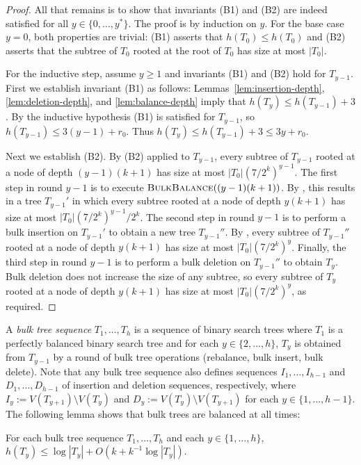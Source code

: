 \documentclass[kpfonts]{patmorin}
\let\le\leqslant
\let\ge\geqslant
\begin{document}
\begin{proof}
  All that remains is to show that invariants (B1) and (B2) are indeed satisfied for all $y\in\{0,\ldots,y^*\}$.  The proof is by induction on $y$.  For the base case $y=0$, both properties are trivial: (B1) asserts that $h(T_0)\le h(T_0)$ and (B2) asserts that the subtree of $T_0$ rooted at the root of $T_0$ has size at most $|T_0|$.

  For the inductive step, assume $y\ge 1$ and invariants (B1) and (B2) hold for $T_{y-1}$.  First we establish invariant (B1) as follows:
  Lemmas~\ref{lem:insertion-depth}, \ref{lem:deletion-depth}, and \ref{lem:balance-depth} imply that $h(T_y)\le h(T_{y-1})+3$.  
  By the inductive hypothesis (B1) is satisfied for $T_{y-1}$, so $h(T_{y-1})\le 3(y-1) + r_0$.  Thus $h(T_y)\le h(T_{y-1}) + 3 \le 3y+r_0$.
  
  Next we establish (B2).  By (B2) applied to $T_{y-1}$, every subtree of $T_{y-1}$ rooted at a node of depth $(y-1)(k+1)$ has size at most $|T_{0}|(7/2^k)^{y-1}$.  The first step in round $y-1$ is to execute $\textsc{BulkBalance}((y-1)(k+1))$.  By , this results in a tree $T_{y-1}'$ in which every subtree rooted at a node of depth $y(k+1)$ has size at most $|T_{0}|(7/2^k)^{y-1}/2^k$.  The second step in round $y-1$ is to perform a bulk insertion on $T_{y-1}'$ to obtain a new tree $T_{y-1}''$.  
  By , every subtree of $T_{y-1}''$ rooted at a node of depth $y(k+1)$ has size at most $|T_{0}|(7/2^k)^{y}$.  Finally, the third step in round $y-1$ is to perform a bulk deletion on $T_{y-1}''$ to obtain $T_{y}$.  Bulk deletion does not increase the size of any subtree, so every subtree of $T_{y}$ rooted at a node of depth $y(k+1)$ has size at most $|T_{0}|(7/2^k)^{y}$, as required.
\end{proof}

A \emph{bulk tree sequence} $T_1,\ldots,T_h$ is a sequence of binary search trees where $T_1$ is a perfectly balanced binary search tree and for each $y\in\{2,\ldots,h\}$, $T_y$ is obtained from $T_{y-1}$ by a round of bulk tree operations (rebalance, bulk insert, bulk delete).  Note that any bulk tree sequence also defines sequences $I_1,\ldots,I_{h-1}$ and $D_1,\ldots,D_{h-1}$ of insertion and deletion sequences, respectively, where $I_y:=V(T_{y+1})\setminus V(T_y)$ and $D_y:=V(T_{y})\setminus V(T_{y+1})$ for each $y\in\{1,\ldots,h-1\}$. 
The following lemma shows that bulk trees are balanced at all times:
\begin{lem}
  For each bulk tree sequence $T_1,\ldots,T_h$ and each $y\in\{1,\ldots,h\}$,  $h(T_y)\le \log|T_y| + O(k+k^{-1}\log|T_y|)$.
\end{lem}
\end{document}
